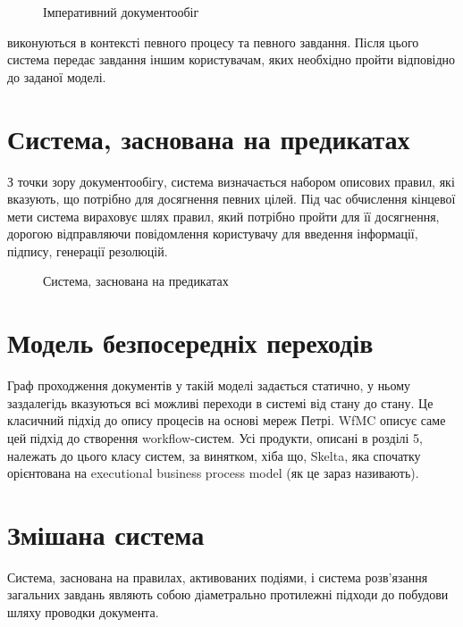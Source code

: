 \documentclass{memoir}
\begin{document}
\begin{figure}[h]
    \centering
    \caption{Імперативний документообіг}
    \label{fig:imperative_workflow}
\end{figure}

виконуються в контексті певного процесу та певного завдання. Після цього система передає завдання іншим користувачам, яких необхідно пройти відповідно до заданої моделі.

\section{Система, заснована на предикатах}

З точки зору документообігу, система визначається набором описових правил, які вказують, що потрібно для досягнення певних цілей. Під час обчислення кінцевої мети система вираховує шлях правил, який потрібно пройти для її досягнення, дорогою відправляючи повідомлення користувачу для введення інформації, підпису, генерації резолюцій.

\begin{figure}[h]
    \centering
    \caption{Система, заснована на предикатах}
    \label{fig:predicate_system}
\end{figure}

\section{Модель безпосередніх переходів}

Граф проходження документів у такій моделі задається статично, у ньому заздалегідь вказуються всі можливі переходи в системі від стану до стану. Це класичний підхід до опису процесів на основі мереж Петрі. WfMC описує саме цей підхід до створення workflow-систем. Усі продукти, описані в розділі 5, належать до цього класу систем, за винятком, хіба що, Skelta, яка спочатку орієнтована на executional business process model (як це зараз називають).

\section{Змішана система}

Система, заснована на правилах, активованих подіями, і система розв’язання загальних завдань являють собою діаметрально протилежні підходи до побудови шляху проводки документа.
\end{document}
